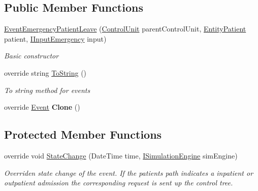 \subsection*{Public Member Functions}
\begin{DoxyCompactItemize}
\item 
\hyperlink{class_general_health_care_elements_1_1_department_models_1_1_emergency_1_1_event_emergency_patient_leave_ac9de31c76acbf3082dafb3f5040ce2c8}{Event\+Emergency\+Patient\+Leave} (\hyperlink{class_simulation_core_1_1_h_c_c_m_elements_1_1_control_unit}{Control\+Unit} parent\+Control\+Unit, \hyperlink{class_general_health_care_elements_1_1_entities_1_1_entity_patient}{Entity\+Patient} patient, \hyperlink{interface_general_health_care_elements_1_1_department_models_1_1_emergency_1_1_i_input_emergency}{I\+Input\+Emergency} input)
\begin{DoxyCompactList}\small\item\em Basic constructor \end{DoxyCompactList}\item 
override string \hyperlink{class_general_health_care_elements_1_1_department_models_1_1_emergency_1_1_event_emergency_patient_leave_ac3b3bf1ebc3e6bf99ce4b3168f70489e}{To\+String} ()
\begin{DoxyCompactList}\small\item\em To string method for events \end{DoxyCompactList}\item 
override \hyperlink{class_simulation_core_1_1_h_c_c_m_elements_1_1_event}{Event} {\bfseries Clone} ()\hypertarget{class_general_health_care_elements_1_1_department_models_1_1_emergency_1_1_event_emergency_patient_leave_a6f8394fdce596e2bd446b47900a854ec}{}\label{class_general_health_care_elements_1_1_department_models_1_1_emergency_1_1_event_emergency_patient_leave_a6f8394fdce596e2bd446b47900a854ec}

\end{DoxyCompactItemize}
\subsection*{Protected Member Functions}
\begin{DoxyCompactItemize}
\item 
override void \hyperlink{class_general_health_care_elements_1_1_department_models_1_1_emergency_1_1_event_emergency_patient_leave_a19c2ab25ce18f640615600c8486f4376}{State\+Change} (Date\+Time time, \hyperlink{interface_simulation_core_1_1_simulation_classes_1_1_i_simulation_engine}{I\+Simulation\+Engine} sim\+Engine)
\begin{DoxyCompactList}\small\item\em Overriden state change of the event. If the patient\textquotesingle{}s path indicates a inpatient or outpatient admission the corresponding request is sent up the control tree. \end{DoxyCompactList}\end{DoxyCompactItemize}

